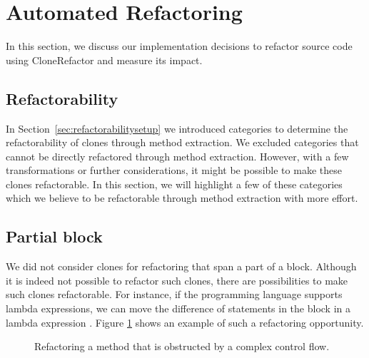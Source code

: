 \section{Automated Refactoring}
In this section, we discuss our implementation decisions to refactor source code using CloneRefactor and measure its impact.

\subsection{Refactorability} \label{sec:discussrefactorability}
In Section~\ref{sec:refactorabilitysetup} we introduced categories to determine the refactorability of clones through method extraction. We excluded categories that cannot be directly refactored through method extraction. However, with a few transformations or further considerations, it might be possible to make these clones refactorable. In this section, we will highlight a few of these categories which we believe to be refactorable through method extraction with more effort.

\subsection{Partial block} \label{sec:partialblockdiscussion}
We did not consider clones for refactoring that span a part of a block. Although it is indeed not possible to refactor such clones, there are possibilities to make such clones refactorable. For instance, if the programming language supports lambda expressions, we can move the difference of statements in the block in a lambda expression \cite{tsantalis2017clone}. Figure \ref{fig:partialblockrefactoring} shows an example of such a refactoring opportunity.

\begin{figure}[H]
\begin{parcolumns}{2}
\end{parcolumns}
\caption{Refactoring a method that is obstructed by a complex control flow.}
\label{fig:partialblockrefactoring}
\end{figure}

